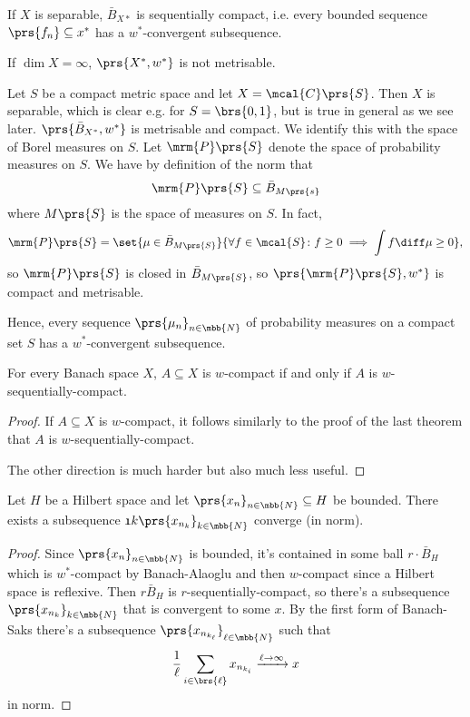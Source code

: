 \documentclass[10pt, twoside]{book}
\begin{document}
\begin{corollary}
If $X$ is separable, $\bar{B}_{X*}$ is sequentially compact, i.e. every bounded sequence $\prs{f_n} \subseteq x^*$ has a $w^*$-convergent subsequence.
\end{corollary}

\begin{exercise}
If $\dim X = \infty$, $\prs{X^*, w^*}$ is not metrisable.
\end{exercise}

\begin{example}
Let $S$ be a compact metric space and let $X = \mcal{C}\prs{S}$. Then $X$ is separable, which is clear e.g. for $S = \brs{0,1}$, but is true in general as we see later.
$\prs{\bar{B}_{X^*}, w^*}$ is metrisable and compact. We identify this with the space of Borel measures on $S$.
Let $\mrm{P}\prs{S}$ denote the space of probability measures on $S$. We have by definition of the norm that
\[\mrm{P}\prs{S} \subseteq \bar{B}_{M\prs{s}}\]
where $M\prs{S}$ is the space of measures on $S$.
In fact,
\[\mrm{P}\prs{S} = \set{\mu \in \bar{B}_{M\prs{S}}}{\forall f \in \mcal{S} \colon f \geq 0 \implies \int f \diff \mu \geq 0} \text{,}\]
so $\mrm{P}\prs{S}$ is closed in $\bar{B}_{M\prs{S}}$, so $\prs{\mrm{P}\prs{S}, w^*}$ is compact and metrisable.

Hence, every sequence $\prs{\mu_n}_{n \in \mbb{N}}$ of probability measures on a compact set $S$ has a $w^*$-convergent subsequence.
\end{example}

\begin{theorem}
For every Banach space $X$, $A \subseteq X$ is $w$-compact if and only if $A$ is $w$-sequentially-compact.
\end{theorem}

\begin{proof}
If $A \subseteq X$ is $w$-compact, it follows similarly to the proof of the last theorem that $A$ is $w$-sequentially-compact.

The other direction is much harder but also much less useful.
\end{proof}

\begin{corollary}
Let $H$ be a Hilbert space and let $\prs{x_n}_{n \in \mbb{N}} \subseteq H$ be bounded. There exists a subsequence $\frak{1}{k}\prs{x_{n_k}}_{k \in \mbb{N}}$ converge (in norm).
\end{corollary}

\begin{proof}
Since $\prs{x_n}_{n \in \mbb{N}}$ is bounded, it's contained in some ball $r \cdot \bar{B}_H$ which is $w^*$-compact by Banach-Alaoglu and then $w$-compact since a Hilbert space is reflexive. Then $r \bar{B}_H$ is $r$-sequentially-compact, so there's a subsequence $\prs{x_{n_k}}_{k \in \mbb{N}}$ that is convergent to some $x$.
By the first form of Banach-Saks there's a subsequence $\prs{x_{n_{k_{\ell}}}}_{\ell \in \mbb{N}}$ such that
\[\frac{1}{\ell} \sum_{i \in \brs{\ell}} x_{n_{k_{i}}} \xrightarrow{\ell\to\infty} x\]
in norm.
\end{proof}
\end{document}
